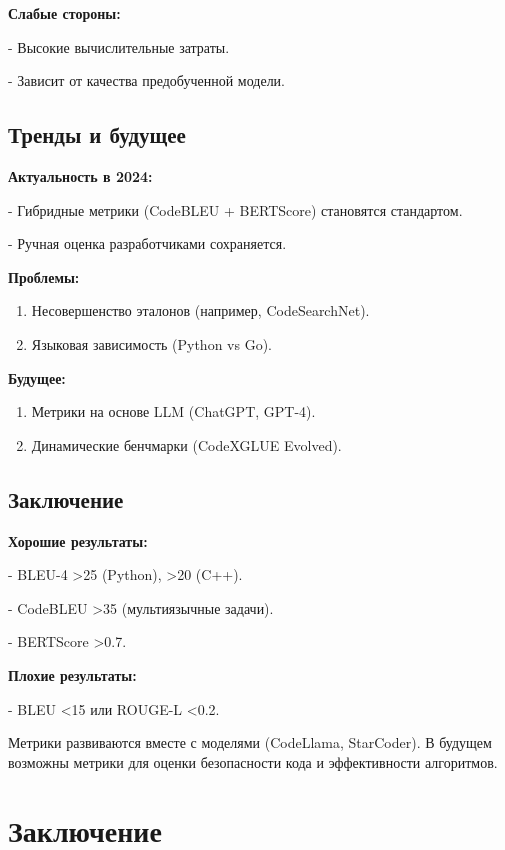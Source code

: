 \documentclass[14pt]{article}
\theoremstyle{definition}
\begin{document}
\textbf{Слабые стороны:}

    
- Высокие вычислительные затраты.
    
- Зависит от качества предобученной модели.


\subsection{Тренды и будущее}

\textbf{Актуальность в 2024:}

    
- Гибридные метрики (CodeBLEU + BERTScore) становятся стандартом.
    
- Ручная оценка разработчиками сохраняется.


\textbf{Проблемы:}
\begin{enumerate}
    \item Несовершенство эталонов (например, CodeSearchNet).
    \item Языковая зависимость (Python vs Go).
\end{enumerate}

\textbf{Будущее:}
\begin{enumerate}
    \item Метрики на основе LLM (ChatGPT, GPT-4).
    \item Динамические бенчмарки (CodeXGLUE Evolved).
\end{enumerate}

\subsection{Заключение}

\textbf{Хорошие результаты:}

    
- BLEU-4 >25 (Python), >20 (C++).
    
- CodeBLEU >35 (мультиязычные задачи).
    
- BERTScore >0.7.


\textbf{Плохие результаты:}

    
- BLEU <15 или ROUGE-L <0.2.


Метрики развиваются вместе с моделями (CodeLlama, StarCoder). В будущем возможны метрики для оценки безопасности кода и эффективности алгоритмов.






\newpage
\section{Заключение}
\end{document}
